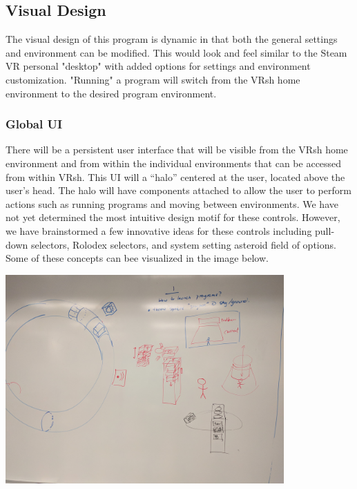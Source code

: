 \documentclass[titlepage,12pt]{article}
\newcommand\name{VRsh\xspace}
\begin{document}
\subsection{Visual Design}
The visual design of this program is dynamic in that both the general
settings and environment can be modified. This would look and feel
similar to the Steam VR personal "desktop" with added options for settings
and environment customization. "Running" a program will switch from the \name
home environment to the desired program environment.

\subsubsection{Global UI}\label{sec:ui}
There will be a persistent user interface that will be visible from the \name
home environment and from within the individual environments that can be
accessed from within \name. This UI will a ``halo'' centered at the user,
located above the user's head. The halo will have components attached to allow
the user to perform actions such as running programs and moving between
environments. We have not yet determined the most intuitive design motif for
these controls. However, we have brainstormed a few innovative ideas for these
controls including pull-down selectors, Rolodex selectors, and system setting
asteroid field of options. Some of these concepts can bee visualized in the 
image below.

\begin{center}
    \includegraphics[width=0.8\textwidth]{./images/visual.jpg}
\end{center}
\end{document}
